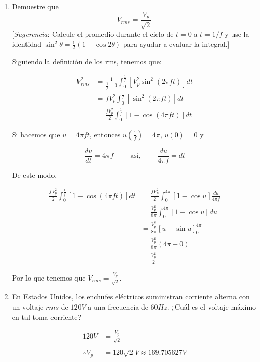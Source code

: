 \documentclass[12pt]{article}
\begin{document}
\begin{enumerate}[label=(\alph*)]
\item Demuestre que
  \[
  V_{rms}=\frac{V_p}{\sqrt{2}}
  \]
    [\textit{Sugerencia}: Calcule el promedio durante el ciclo de $t= 0$ a $t = 1/f$ y use la identidad $\sin^2{\theta}= \frac{1}{2}(1-\cos{2\theta})$ para ayudar a evaluar la integral.]

    Siguiendo la definición de los rms, tenemos que:

    \begin{align*}
      V_{rms}^2
      &= \frac{1}{\frac{1}{f}-0} \int_0^{\frac{1}{f}} \left[V_p^2 \sin^2{(2\pi ft)} \right] dt \\
      &= fV_p^2 \int_0^{\frac{1}{f}} \left[\sin^2{(2\pi ft)} \right] dt \\
      &= \frac{fV_p^2}{2} \int_0^{\frac{1}{f}} \left[ 1-\cos{(4\pi ft)} \right] dt 
    \end{align*}

  Si hacemos que $u = 4\pi ft$, entonces $u(\frac{1}{f})=4\pi$, $u(0)=0$ y
  
  \[
  \frac{du}{dt}=4\pi f \qquad \text{ así, } \qquad \frac{du}{4\pi f}=dt
  \]

  De este modo,

  \begin{align*}
    \frac{fV_p^2}{2} \int_0^{\frac{1}{f}} \left[ 1-\cos{(4\pi ft)} \right] dt 
    & =    \frac{fV_p^2}{2} \int_0^{4\pi} \left[ 1-\cos{u} \right] \frac{du}{4\pi f} \\
    & =    \frac{V_p^2}{8\pi} \int_0^{4\pi} \left[ 1-\cos{u} \right] du \\
    &= \frac{V_p^2}{8\pi} \left[ u-\sin{u} \right]_0^{4\pi}\\
    &= \frac{V_p^2}{8\pi} (4\pi-0)\\
    &=\frac{V_p^2}{2}
  \end{align*}

  Por lo que tenemos que $V_{rms}=\frac{V_p}{\sqrt{2}}$.
  
\item En Estados Unidos, los enchufes eléctricos suministran corriente alterna con un voltaje $rms$ de $120 V$ a una frecuencia de $60 Hz$. ¿Cuál es el voltaje máximo en tal toma corriente?

  \begin{align*}
    120V
    &= \frac{V_p}{\sqrt{2}} \\ \\
    \therefore V_p &= 120\sqrt{2}V \approx 169.705627 V
  \end{align*}



\end{enumerate}
\end{document}
